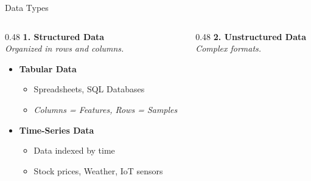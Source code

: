\begin{frame}{Data Types}
    \begin{columns}[T]
        \begin{column}{0.48\textwidth}
            \textbf{\large 1. Structured Data} \\
            \vspace{0.3em}
            \textit{Organized in rows and columns.}
            \vspace{0.8em}
            
            \begin{itemize}
                \setlength\itemsep{0.8em}
                \item \textbf{Tabular Data}
                \begin{itemize}
                    \item Spreadsheets, SQL Databases
                    \item \textit{Columns = Features, Rows = Samples}
                \end{itemize}
                \item \textbf{Time-Series Data}
                \begin{itemize}
                    \item Data indexed by time
                    \item Stock prices, Weather, IoT sensors
                \end{itemize}
            \end{itemize}
        \end{column}

        \begin{column}{0.48\textwidth}
            \textbf{\large 2. Unstructured Data} \\
            \vspace{0.3em}
            \textit{Complex formats.}
            \vspace{0.8em}


\end{column}
\end{columns}
\end{frame}
